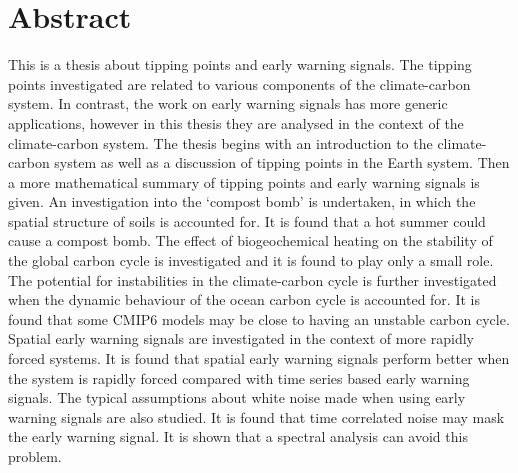 \chapter{Abstract}

This is a thesis about tipping points and early warning signals.
The tipping points investigated are related to various components of the climate-carbon system.
In contrast, the work on early warning signals has more generic applications, however in this thesis they are analysed in the context of the climate-carbon system.
The thesis begins with an introduction to the climate-carbon system as well as a discussion of tipping points in the
Earth system. Then a more mathematical summary of tipping points and early warning signals is given. An investigation into
the `compost bomb' is undertaken, in which the spatial structure of soils is accounted for. It is found that a hot summer could cause a compost bomb.
The effect of biogeochemical heating on the stability of the global carbon cycle is investigated and it is found to play only a small role.
The potential for instabilities in the climate-carbon cycle is further investigated when the dynamic behaviour of the ocean carbon cycle is accounted for. It is found
that some CMIP$6$ models may be close to having an unstable carbon cycle. Spatial early warning signals are investigated in the context of more rapidly forced
systems. It is found that spatial early warning signals perform better when the system is rapidly forced compared with time series based early warning signals.
The typical assumptions about white noise made when using early warning signals are also studied. It is found that time correlated noise may mask the
early warning signal. It is shown that a spectral analysis can avoid this problem.
